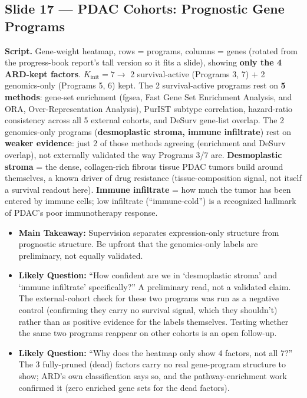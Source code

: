 \documentclass[11pt]{article}
\newcommand{\scriptlabel}{\textbf{Script. }}
\newcommand{\sectionlabel}[1]{\textbf{#1}}
\newcommand{\key}[1]{\textcolor{keyblue}{\textbf{#1}}}        %
\begin{document}
\subsection*{Slide 17 --- PDAC Cohorts: Prognostic Gene Programs}
\scriptlabel Gene-weight heatmap, rows = programs, columns = genes (rotated from the progress-book
report's tall version so it fits a slide), showing \key{only the 4 ARD-kept factors}. $K_\text{init}=7
\to$ 2 survival-active (Programs 3, 7) $+$ 2 genomics-only (Programs 5, 6) kept. The 2 survival-active
programs rest on \key{5 methods}: gene-set enrichment (fgsea, Fast Gene Set Enrichment Analysis, and
ORA, Over-Representation Analysis), PurIST subtype correlation,
hazard-ratio consistency across all 5 external cohorts, and DeSurv gene-list overlap. The 2
genomics-only programs (\key{desmoplastic stroma, immune infiltrate}) rest on \key{weaker evidence}:
just 2 of those methods agreeing (enrichment and DeSurv overlap), not externally validated the way
Programs 3/7 are. \key{Desmoplastic stroma} = the dense, collagen-rich fibrous tissue PDAC tumors
build around themselves, a known driver of drug resistance (tissue-composition signal, not itself a
survival readout here). \key{Immune infiltrate} = how much the tumor has been entered by immune
cells; low infiltrate (``immune-cold'') is a recognized hallmark of PDAC's poor immunotherapy
response.

\begin{itemize}
\item \sectionlabel{Main Takeaway:} Supervision separates expression-only structure from prognostic
structure. Be upfront that the genomics-only labels are preliminary, not equally validated.
\item \sectionlabel{Likely Question:} ``How confident are we in `desmoplastic stroma' and `immune
infiltrate' specifically?'' A preliminary read, not a validated claim. The external-cohort
check for these two programs was run as a negative control (confirming they carry no survival
signal, which they shouldn't) rather than as positive evidence for the labels themselves. Testing
whether the same two programs reappear on other cohorts is an open follow-up.
\item \sectionlabel{Likely Question:} ``Why does the heatmap only show 4 factors, not all 7?'' The 3
fully-pruned (dead) factors carry no real gene-program structure to show; ARD's own classification
says so, and the pathway-enrichment work confirmed it (zero enriched gene sets for the dead factors).
\end{itemize}
\end{document}
